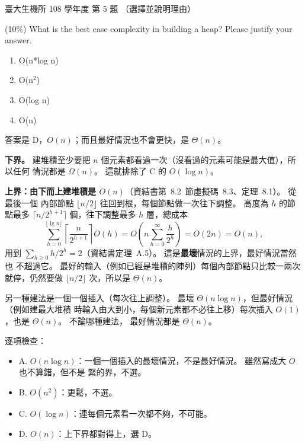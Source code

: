 \begin{pastexam}[label={px:ntu-108-bime-ds-05}]{臺大生機所 108 學年度 第 5 題}
（選擇並說明理由）

(10\%) What is the best case complexity in building a heap? Please justify your answer.
\begin{enumerate}[label=\Alph*.]
\item O(n*log n)
\item O(n$^2$)
\item O(log n)
\item O(n)
\end{enumerate}
\end{pastexam}

\begin{pastsoln}
答案是 D，$O(n)$；而且最好情況也不會更快，是 $\Theta(n)$。

\textbf{下界。} 建堆積至少要把 $n$ 個元素都看過一次（沒看過的元素可能是最大值），所以任何
情況都是 $\Omega(n)$。 這就排除了 C 的 $O(\log n)$。

\textbf{上界：由下而上建堆積是 $O(n)$}（資結書第~8.2~節虛擬碼~8.3、定理~8.1）。 從最後一個
內部節點 $\lfloor n/2 \rfloor$ 往回到根，每個節點做一次往下調整。 高度為 $h$ 的節點最多
$\lceil n / 2^{h+1} \rceil$ 個，往下調整最多 $h$ 層，總成本
\[
\sum_{h=0}^{\lfloor \lg n \rfloor} \left\lceil \frac{n}{2^{h+1}} \right\rceil O(h)
= O\!\left(n \sum_{h=0}^{\infty} \frac{h}{2^h}\right) = O(2n) = O(n),
\]
用到 $\sum_{h \ge 0} h/2^h = 2$（資結書定理~A.5）。 這是\textbf{最壞}情況的上界，最好情況當然也
不超過它。 最好的輸入（例如已經是堆積的陣列）每個內部節點只比較一兩次就停，仍然要做
$\lfloor n/2 \rfloor$ 次，所以是 $\Theta(n)$。

另一種建法是一個一個插入（每次往上調整）。 最壞 $\Theta(n \log n)$，但最好情況（例如建最大堆積
時輸入由大到小，每個新元素都不必往上移）每次插入 $O(1)$，也是 $\Theta(n)$。 不論哪種建法，
最好情況都是 $\Theta(n)$。

逐項檢查：
\begin{itemize}
\item A. $O(n \log n)$：一個一個插入的最壞情況，不是最好情況。 雖然寫成大 $O$ 也不算錯，但不是
緊的界，不選。
\item B. $O(n^2)$：更鬆，不選。
\item C. $O(\log n)$：連每個元素看一次都不夠，不可能。
\item D. $O(n)$：上下界都對得上，選 D。
\end{itemize}
\end{pastsoln}
